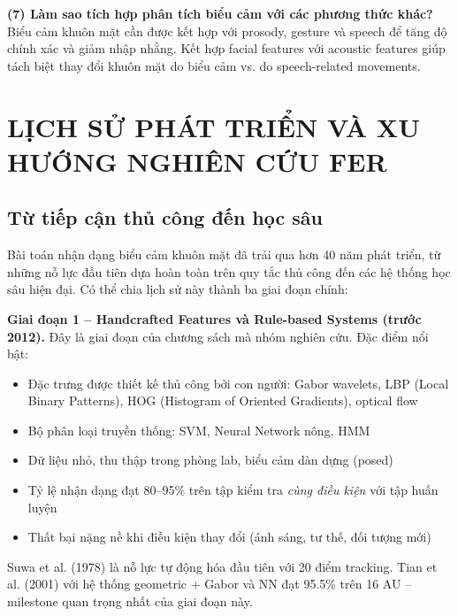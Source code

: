 \documentclass[12pt,a4paper]{article}
\let\oldtextbf\textbf
\renewcommand{\textbf}[1]{\oldtextbf{\textcolor{hcmublue}{#1}}}
\begin{document}
\textbf{(7) Làm sao tích hợp phân tích biểu cảm với các phương thức khác?}
Biểu cảm khuôn mặt cần được kết hợp với prosody, gesture và speech để tăng độ chính xác và giảm nhập nhằng. Kết hợp facial features với acoustic features giúp tách biệt thay đổi khuôn mặt do biểu cảm vs. do speech-related movements.

\section{LỊCH SỬ PHÁT TRIỂN VÀ XU HƯỚNG NGHIÊN CỨU FER}

\subsection{Từ tiếp cận thủ công đến học sâu}

Bài toán nhận dạng biểu cảm khuôn mặt đã trải qua hơn 40 năm phát triển, từ những nỗ lực đầu tiên dựa hoàn toàn trên quy tắc thủ công đến các hệ thống học sâu hiện đại. Có thể chia lịch sử này thành ba giai đoạn chính:

\textbf{Giai đoạn 1 -- Handcrafted Features và Rule-based Systems (trước 2012).}
Đây là giai đoạn của chương sách mà nhóm nghiên cứu. Đặc điểm nổi bật:
\begin{itemize}
    \item Đặc trưng được thiết kế thủ công bởi con người: Gabor wavelets, LBP (Local Binary Patterns), HOG (Histogram of Oriented Gradients), optical flow
    \item Bộ phân loại truyền thống: SVM, Neural Network nông, HMM
    \item Dữ liệu nhỏ, thu thập trong phòng lab, biểu cảm dàn dựng (posed)
    \item Tỷ lệ nhận dạng đạt 80--95\% trên tập kiểm tra \textit{cùng điều kiện} với tập huấn luyện
    \item Thất bại nặng nề khi điều kiện thay đổi (ánh sáng, tư thế, đối tượng mới)
\end{itemize}

Suwa et al. (1978) là nỗ lực tự động hóa đầu tiên với 20 điểm tracking. Tian et al. (2001) với hệ thống geometric + Gabor và NN đạt 95.5\% trên 16 AU -- milestone quan trọng nhất của giai đoạn này.
\end{document}
